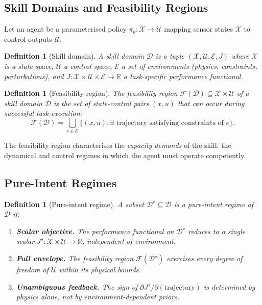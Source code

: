 \documentclass[11pt,twocolumn,a4paper]{article}
\newtheorem{definition}[theorem]{Definition}
\newcommand{\cF}{\mathcal{F}}
\newcommand{\cD}{\mathcal{D}}
\newcommand{\cE}{\mathcal{E}}
\newcommand{\cX}{\mathcal{X}}
\newcommand{\cU}{\mathcal{U}}
\newcommand{\R}{\mathbb{R}}
\begin{document}
\subsection{Skill Domains and Feasibility Regions}

Let an agent be a parameterised policy $\pi_\theta: \cX \to \cU$ mapping sensor states $\cX$ to control outputs $\cU$.

\begin{definition}[Skill domain]
\label{def:skill-domain}
A \emph{skill domain} $\cD$ is a tuple $(\cX, \cU, \cE, J)$ where $\cX$ is a state space, $\cU$ a control space, $\cE$ a set of environments (physics, constraints, perturbations), and $J: \cX \times \cU \times \cE \to \R$ a task-specific performance functional.
\end{definition}

\begin{definition}[Feasibility region]
\label{def:feasibility-region}
The \emph{feasibility region} $\cF(\cD) \subseteq \cX \times \cU$ of a skill domain $\cD$ is the set of state-control pairs $(x, u)$ that can occur during successful task execution:
\begin{equation}
\cF(\cD) = \bigcup_{e \in \cE} \{(x, u) : \exists \text{ trajectory satisfying constraints of } e\}.
\end{equation}
\end{definition}

The feasibility region characterises the \emph{capacity demands} of the skill: the dynamical and control regimes in which the agent must operate competently.

\subsection{Pure-Intent Regimes}

\begin{definition}[Pure-intent regime]
\label{def:pure-intent}
A subset $\cD^\star \subseteq \cD$ is a \emph{pure-intent regime} of $\cD$ if:
\begin{enumerate}[leftmargin=*,itemsep=1pt]
\item[(P1)] \textbf{Scalar objective.} The performance functional on $\cD^\star$ reduces to a single scalar $J^\star: \cX \times \cU \to \R$, independent of environment.
\item[(P2)] \textbf{Full envelope.} The feasibility region $\cF(\cD^\star)$ exercises every degree of freedom of $\cU$ within its physical bounds.
\item[(P3)] \textbf{Unambiguous feedback.} The sign of $\partial J^\star / \partial (\text{trajectory})$ is determined by physics alone, not by environment-dependent priors.
\end{enumerate}
\end{definition}
\end{document}
